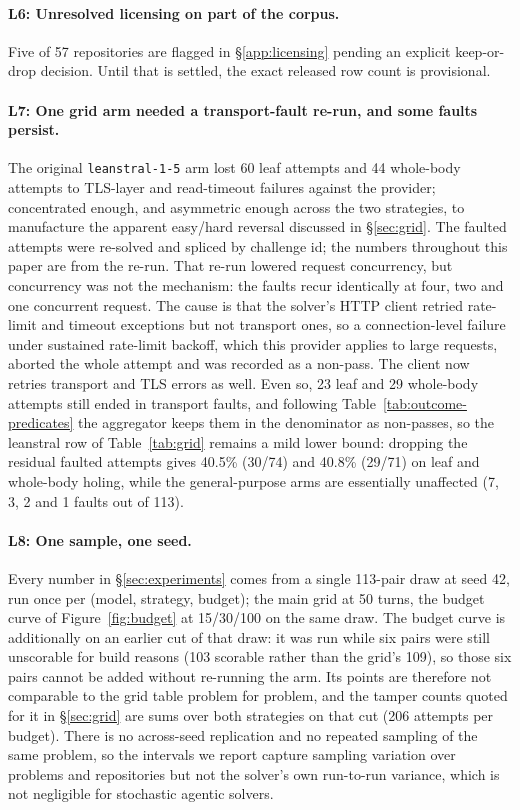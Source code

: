 \documentclass{article}
\begin{document}
\paragraph{L6: Unresolved licensing on part of the corpus.} Five of 57 repositories are flagged in
\S\ref{app:licensing} pending an explicit keep-or-drop decision. Until that is settled, the exact
released row count is provisional.

\paragraph{L7: One grid arm needed a transport-fault re-run, and some faults persist.} The original \texttt{leanstral-1-5} arm lost 60 leaf attempts and 44 whole-body attempts to TLS-layer and read-timeout failures against the provider; concentrated enough, and asymmetric enough across the two strategies, to manufacture the apparent easy/hard reversal discussed in \S\ref{sec:grid}. The faulted attempts were re-solved and spliced by challenge id; the numbers throughout this paper are from the re-run. That re-run lowered request concurrency, but concurrency was not the mechanism: the faults recur identically at four, two and one concurrent request. The cause is that the solver's HTTP client retried rate-limit and timeout exceptions but not transport ones, so a connection-level failure under sustained rate-limit backoff, which this provider applies to large requests, aborted the whole attempt and was recorded as a non-pass. The client now retries transport and TLS errors as well. Even so, 23 leaf and 29 whole-body attempts still ended in transport faults, and following Table~\ref{tab:outcome-predicates} the aggregator keeps them in the denominator as non-passes, so the leanstral row of Table~\ref{tab:grid} remains a mild lower bound: dropping the residual faulted attempts gives 40.5\% (30/74) and 40.8\% (29/71) on leaf and whole-body holing, while the general-purpose arms are essentially unaffected (7, 3, 2 and 1 faults out of 113).

\paragraph{L8: One sample, one seed.} Every number in \S\ref{sec:experiments} comes from a single 113-pair draw at seed 42, run once per (model, strategy, budget); the main grid at 50 turns, the budget curve of Figure~\ref{fig:budget} at 15/30/100 on the same draw. The budget curve is additionally on an earlier cut of that draw: it was run while six pairs were still unscorable for build reasons (103 scorable rather than the grid's 109), so those six pairs cannot be added without re-running the arm. Its points are therefore not comparable to the grid table problem for problem, and the tamper counts quoted for it in \S\ref{sec:grid} are sums over both strategies on that cut (206 attempts per budget). There is no across-seed replication and no repeated sampling of the same problem, so the intervals we report capture sampling variation over problems and repositories but not the solver’s own run-to-run variance, which is not negligible for stochastic agentic solvers.
\end{document}
